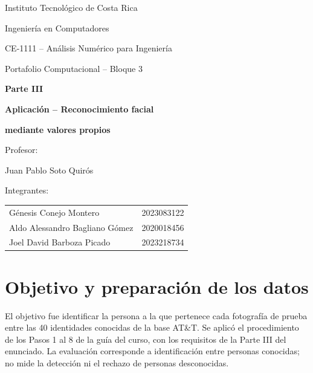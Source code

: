\documentclass[11pt,a4paper]{article}
\begin{document}
\hypersetup{pageanchor=false}
\begin{titlepage}
\centering
\vspace*{0.4cm}
{\large Instituto Tecnológico de Costa Rica\par}
\vspace{1.5cm}
{\large Ingeniería en Computadores\par}
\vspace{1.5cm}
{\large CE-1111 -- Análisis Numérico para Ingeniería\par}
\vspace{0.3cm}
{\large Portafolio Computacional -- Bloque 3\par}
\vspace{0.9cm}
{\Large\bfseries Parte III\par}
\vspace{0.25cm}
{\Large\bfseries Aplicación -- Reconocimiento facial\par}
{\Large\bfseries mediante valores propios\par}
\vspace{1.5cm}
{\large Profesor:\par}
\vspace{0.3cm}
{\large Juan Pablo Soto Quirós\par}
\vfill
{\large Integrantes:\par}
\vspace{0.4cm}
\begin{tabular}{l@{\quad|\quad}l}
Génesis Conejo Montero & 2023083122\\[5pt]
Aldo Alessandro Bagliano Gómez & 2020018456\\[5pt]
Joel David Barboza Picado & 2023218734
\end{tabular}
\vspace*{1.7cm}
\end{titlepage}
\hypersetup{pageanchor=true}

\section{Objetivo y preparación de los datos}
El objetivo fue identificar la persona a la que pertenece cada fotografía de prueba
entre las 40 identidades conocidas de la base AT\&T. Se aplicó el procedimiento de
los Pasos 1 al 8 de la guía del curso, con los requisitos de la Parte III del
enunciado. La evaluación corresponde a identificación entre
personas conocidas; no mide la detección ni el rechazo de personas desconocidas.
\end{document}
